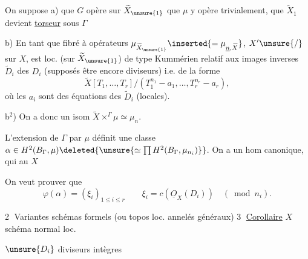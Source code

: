 On suppose a) que $G$ opère sur $\widetilde X_{\unsure{1}}$ que $\mu$ y opère trivialement, que  $\widetilde X_1$ devient \uline{torseur} sous $\Gamma$

b) En tant que fibré à opérateurs $\mu_{\widetilde X_{\unsure{1}}}\inserted{=\mu_{\underline n,\widetilde X}}$, $X'\unsure{/}$ sur $X$, est loc.  (sur $\widetilde X_{\unsure{1}}$) de type Kummérien relatif aux images inverses $\widetilde D_i$ des $D_i$ (supposés être encore diviseurs) i.e. de la forme
\[
\widetilde X[T_1,\ldots,T_r]/(T_1^{n_1}-a_1,\ldots,T_r^{n_r}-a_r),
\]
où les $a_i$ sont des équations des $\widetilde D_i$ (locales).

b$^2$)  On a donc un isom $\widetilde X\mathbin{\times}^{\Gamma}\mu\simeq\mu_n$.


L'extension de $\Gamma$ par $\mu$ définit une classe $\alpha\in H^2(B_\Gamma,\mu)\deleted{\unsure{\simeq\prod H^2(B_\Gamma,\mu_{n_i})}}$. On a un hom canonique, qui au $X$

On veut prouver que 
\[
\varphi(\alpha)=(\xi_i)_{1\leq i\leq r}\qquad
\xi_i=c(\underline{O}_X(D_i))\quad(\bmod n_i).
\]

\textcircled{2} Variantes schémas formels (ou topos loc. annelés généraux)
\textcircled{3} \uline{Corollaire} $X$ schéma normal  loc. 

$\unsure{D_i}$ diviseurs intègres 


